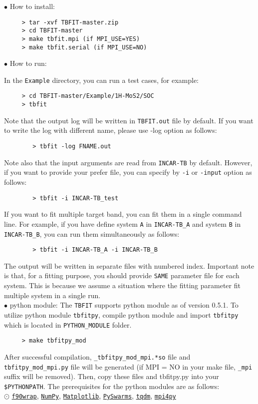 \documentclass[a4paper,12pt]{scrartcl}
\newcommand{\tbfitname}{\textcolor{blue!85!white}{\texttt{TBFIT}}}
\begin{document}
$\bullet$ How to install:
	\begin{Verbatim}
	 > tar -xvf TBFIT-master.zip
	 > cd TBFIT-master
	 > make tbfit.mpi (if MPI_USE=YES)
	 > make tbfit.serial (if MPI_USE=NO)
	\end{Verbatim}
$\bullet$ How to run:

\indent In the \texttt{Example} directory, you can run a test cases, for example:
	\begin{Verbatim}
	 > cd TBFIT-master/Example/1H-MoS2/SOC
	 > tbfit
	\end{Verbatim}
\indent \indent Note that the output log will be written in \texttt{TBFIT.out} file by default. If you want to write the log with different name, please use -log option as follows:
    \begin{verbatim}
        > tbfit -log FNAME.out
    \end{verbatim}

\indent Note also that the input arguments are read from \texttt{INCAR-TB} by default. However, if you want to provide your prefer file, you can specify by \texttt{-i} or \texttt{-input} option as follows:
    \begin{verbatim}
        > tbfit -i INCAR-TB_test
    \end{verbatim}

\indent If you want to fit multiple target band, you can fit them in a single command line.
\indent For example, if you have define system \texttt{A} in \texttt{INCAR-TB\_A} and  system \texttt{B} in \texttt{INCAR-TB\_B}, you can run them simultaneously as follows:
    \begin{verbatim}
        > tbfit -i INCAR-TB_A -i INCAR-TB_B
    \end{verbatim}
\indent The output will be written in separate files with numbered index. Important note is that, for a fitting purpose, you should provide \texttt{SAME} parameter file for each system. This is because we assume a situation where the fitting parameter fit multiple system in a single run.\\


$\bullet$ python module:
\indent The \tbfitname{} supports python module as of version 0.5.1. To utilize python module \texttt{tbfitpy}, compile python module and import \texttt{tbfitpy} which is located in \texttt{PYTHON\_MODULE} folder.
	\begin{Verbatim}
	 > make tbfitpy_mod
	\end{Verbatim}
	After successful compilation, \texttt{\_tbfitpy\_mod\_mpi.*so} file and
	\texttt{tbfitpy\_mod\_mpi.py} file will be generated (if MPI = NO in your make file,
	\texttt{\_mpi} suffix will be removed). 
	Then, copy these files and tbfitpy.py into your \texttt{\$PYTHONPATH}.
	The prerequisites for the python modules are as follows: \\
	\indent $\odot$  \href{https://github.com/jameskermode/f90wrap}{\texttt{f90wrap}}, \href{https://numpy.org}{\texttt{NumPy}}, \href{https://matplotlib.org/}{\texttt{Matplotlib}}, \href{https://pyswarms.readthedocs.io/en/latest/}{\texttt{PySwarms}}, \href{https://github.com/tqdm/tqdm}{\texttt{tqdm}}, \href{https://github.com/mpi4py/mpi4py}{\texttt{mpi4py}} \\
	
\end{document}
